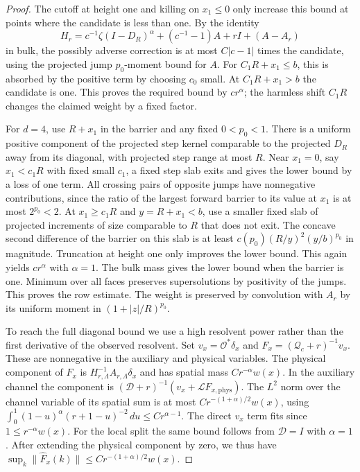 \documentclass[11pt]{article}
\theoremstyle{definition}
\begin{document}
\begin{proof}
The cutoff at height one and killing on \(x_1\le0\) only
increase this bound at points where the candidate is less
than one. By the identity
\begin{equation}
 H_r=c^{-1}\zeta(I-D_R)^\alpha+(c^{-1}-1)A+rI+(A-A_r)
\end{equation}
in bulk, the possibly adverse correction is at most
\(C|c-1|\) times the candidate, using the projected jump
\(p_0\)-moment bound for \(A\).
For \(C_1R+x_1\le b\), this is absorbed by the positive
term by choosing \(c_0\) small. At \(C_1R+x_1>b\) the
candidate is one. This proves the required bound by
\(cr^\alpha\); the harmless shift \(C_1R\) changes the
claimed weight by a fixed factor.

For \(d=4\), use \(R+x_1\) in the barrier and any fixed
\(0<p_0<1\). There is a uniform positive component of the
projected step kernel comparable to the projected \(D_R\)
away from its diagonal, with projected step range at most
\(R\). Near \(x_1=0\), say \(x_1<c_1R\) with fixed small
\(c_1\), a fixed step slab exits and gives the lower bound
by a loss of one term. All crossing pairs of opposite
jumps have nonnegative contributions, since the ratio of
the largest forward barrier to its value at \(x_1\) is at
most \(2^{p_0}<2\). At \(x_1\ge c_1 R\) and
\(y=R+x_1<b\), use a smaller fixed slab of projected
increments of size comparable to \(R\) that does not exit.
The concave second difference of the barrier on this slab
is at least \(c(p_0)(R/y)^2(y/b)^{p_0}\) in magnitude.
Truncation at height one only improves the lower bound.
This again yields \(cr^\alpha\) with \(\alpha=1\).
The bulk mass gives the
lower bound when the barrier is one. Minimum over all faces
preserves supersolutions by positivity of the jumps. This
proves the row estimate. The weight is preserved by convolution
with \(A_r\) by its uniform moment in \((1+|z|/R)^{p_0}\).

To reach the full diagonal bound we use a high resolvent power
rather than the first derivative of the observed resolvent.
Set \(v_x=\mathcal O^*\delta_x\) and
\(F_x=(\mathcal Q_c+r)^{-1}v_x\). These are nonnegative
in the auxiliary and physical variables. The physical component
of \(F_x\) is \(H_{r,\Lambda}^{-1}A_{r,\Lambda}\delta_x\) and
has spatial mass \(C r^{-\alpha}w(x)\). In the auxiliary
channel the component is \((\mathcal D+r)^{-1}(v_x+
\mathcal L F_{x,\mathrm{phys}})\). The \(L^2\) norm over the
channel variable of its spatial sum is at most
\(C r^{-(1+\alpha)/2}w(x)\), using
\(\int_0^1(1-u)^\alpha(r+1-u)^{-2}\,du\le Cr^{\alpha-1}\).
The direct \(v_x\) term fits since \(1\le r^{-\alpha}w(x)\).
For the local split the same bound follows from \(\mathcal D=I\)
with \(\alpha=1\). After extending the physical component by
zero, we thus have
\(\sup_k\|\widehat F_x(k)\|\le Cr^{-(1+\alpha)/2}w(x)\).


\end{proof}
\end{document}

